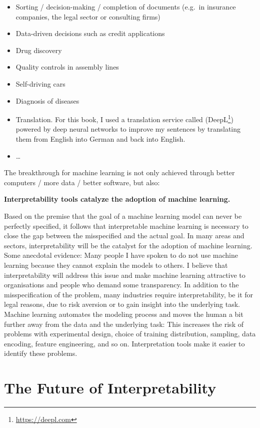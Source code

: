 \documentclass[12pt,]{krantz}
\providecommand{\tightlist}{%
  \setlength{\itemsep}{0pt}\setlength{\parskip}{0pt}}
\renewcommand{\href}[2]{#2\footnote{\url{#1}}}
\begin{document}
\begin{itemize}
\tightlist
\item
  Sorting / decision-making / completion of documents (e.g.~in insurance
  companies, the legal sector or consulting firms)
\item
  Data-driven decisions such as credit applications
\item
  Drug discovery
\item
  Quality controls in assembly lines
\item
  Self-driving cars
\item
  Diagnosis of diseases
\item
  Translation. For this book, I used a translation service called
  (\href{https://deepl.com}{DeepL}) powered by deep neural networks to
  improve my sentences by translating them from English into German and
  back into English.
\item
  \ldots{}
\end{itemize}

The breakthrough for machine learning is not only achieved through
better computers / more data / better software, but also:

\textbf{Interpretability tools catalyze the adoption of machine
learning.}

Based on the premise that the goal of a machine learning model can never
be perfectly specified, it follows that interpretable machine learning
is necessary to close the gap between the misspecified and the actual
goal. In many areas and sectors, interpretability will be the catalyst
for the adoption of machine learning. Some anecdotal evidence: Many
people I have spoken to do not use machine learning because they cannot
explain the models to others. I believe that interpretability will
address this issue and make machine learning attractive to organisations
and people who demand some transparency. In addition to the
misspecification of the problem, many industries require
interpretability, be it for legal reasons, due to risk aversion or to
gain insight into the underlying task. Machine learning automates the
modeling process and moves the human a bit further away from the data
and the underlying task: This increases the risk of problems with
experimental design, choice of training distribution, sampling, data
encoding, feature engineering, and so on. Interpretation tools make it
easier to identify these problems.

\section{The Future of
Interpretability}\label{the-future-of-interpretability}
\end{document}

